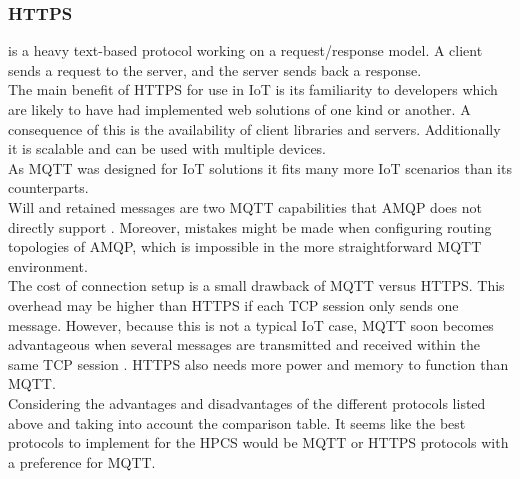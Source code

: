 \subsubsection{HTTPS} is a heavy text-based protocol working on a request/response model. A client sends a request to the server, and the server sends back a response.\\
The main benefit of HTTPS for use in IoT is its familiarity to developers which are likely to have had implemented web solutions of one kind or another. A consequence of this is the availability of client libraries and servers. Additionally it is scalable and can be used with multiple devices.\\


As MQTT was designed for IoT solutions it fits many more IoT scenarios than its counterparts. \\
Will and retained messages are two MQTT capabilities that AMQP does not directly support \cite{b2}. Moreover, mistakes might be made when configuring routing topologies of AMQP, which is impossible in the more straightforward MQTT environment.\\
The cost of connection setup is a small drawback of MQTT versus HTTPS. This overhead may be higher than HTTPS if each TCP session only sends one message. However, because this is not a typical IoT case, MQTT soon becomes advantageous when several messages are transmitted and received within the same TCP session \cite{b3}. HTTPS also needs more power and memory to function than MQTT.\\

Considering the advantages and disadvantages of the different protocols listed above and taking into account the comparison table.
It seems like the best protocols to implement for the HPCS would be MQTT or HTTPS protocols with a preference for MQTT.

